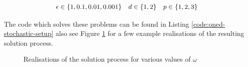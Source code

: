 \begin{equation*}
  \begin{array}{c c c}
    \epsilon \in \{1, 0.1, 0.01, 0.001\} &
    d \in \{1, 2\} &
    p \in \{1, 2, 3\}
  \end{array}
\end{equation*}

The code which solves these problems can be found in Listing
\ref{code:oned-stochastic-setup} also see Figure
\ref{fig:oned-stochastic-realisations} for a few example realisations of the
resulting solution process.

\begin{figure}
    \centering
    \begin{subfigure}[b]{0.55\textwidth}
        \centering
    \end{subfigure}
    \begin{subfigure}[b]{0.55\textwidth}
        \centering
    \end{subfigure}
    \caption{Realisations of the solution process for various values of $\omega$}
    \label{fig:oned-stochastic-realisations}
\end{figure}

